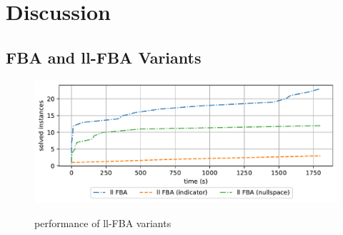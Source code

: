 \clearpage
\section{Discussion}

\subsection{FBA and ll-FBA Variants}
\begin{figure}[h!]
    \caption{performance of ll-FBA variants}
    \centering
    \includegraphics[width=1.0\textwidth]{Images/fba_variants_comparison_plot.pdf}
    \label{fig:ll_fba_comparion}
\end{figure}



